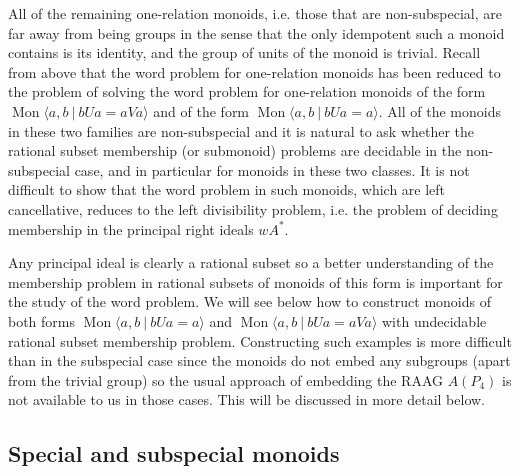 \documentclass{amsart}
\newcommand{\Mpres}[2]{\operatorname{Mon}\bigl\langle #1\:|\:#2 \bigr\rangle}
\theoremstyle{plain}
\theoremstyle{definition}
\begin{document}
All of the remaining one-relation monoids, i.e. those that are non-subspecial, are far away from being groups in the sense that the only idempotent such a monoid contains is its identity, and the group of units of the monoid is trivial. Recall from above that the word problem for one-relation monoids has been reduced to the problem of solving the word problem for one-relation monoids of the form $\Mpres{a,b}{bUa=aVa}$ and of the form $\Mpres{a,b}{bUa=a}$. All of the monoids in these two families are non-subspecial and it is natural to ask whether the rational subset membership (or submonoid) problems are decidable in the non-subspecial case, and in particular for monoids in these two classes. It is not difficult to show that the word problem in such monoids, which are left cancellative, reduces to the left divisibility problem, i.e. the problem of deciding membership in the principal right ideals $wA^\ast$. 


Any principal ideal is clearly a rational subset so a better understanding of the membership problem in rational subsets of monoids of this form is important for the study of the word problem. We will see below how to construct monoids of both forms $\Mpres{a,b}{bUa=a}$ and $\Mpres{a,b}{bUa=aVa}$ with undecidable rational subset membership problem. Constructing such examples is more difficult than in the subspecial case since the monoids do not embed any subgroups (apart from the trivial group) so the usual approach of embedding the RAAG $A(P_4)$ is not available to us in those cases. This will be discussed in more detail below. 
\subsection{Special and subspecial monoids} 
\end{document}
